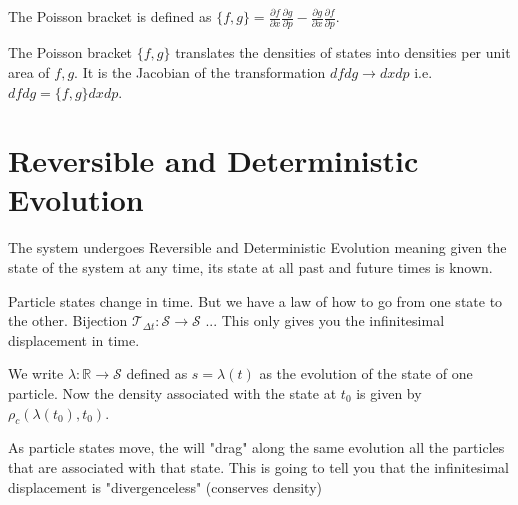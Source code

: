 \documentclass{article}
\begin{document}
\begin{defn}
	The Poisson bracket is defined as $\{f,g\} = \frac{\partial f}{\partial x}\frac{\partial g}{\partial p} - \frac{\partial g}{\partial x}\frac{\partial f}{\partial p}$.
\end{defn}

\begin{prop}
	The Poisson bracket $\{f, g\}$ translates the densities of states into densities per unit area of $f, g$. It is the Jacobian of the transformation $dfdg \rightarrow dxdp$ i.e. $dfdg = \{f,g\}dxdp$.
\end{prop}
	
\section{Reversible and Deterministic Evolution}

\begin{assump}
	The system undergoes Reversible and Deterministic Evolution meaning given the state of the system at any time, its state at all past and future times is known.
\end{assump}

Particle states change in time. But we have a law of how to go from one state to the other. Bijection $\mathcal{T}_{\Delta t} : \mathcal{S} \to \mathcal{S}$ ... This only gives you the infinitesimal displacement in time.

\begin{defn}
	We write $\lambda: \mathbb{R} \rightarrow \mathcal{S}$ defined as $s = \lambda(t)$ as the evolution of the state of one particle. Now the density associated with the state at $t_0$ is given by $\rho_c(\lambda(t_0),t_0)$.
\end{defn}

	
As particle states move, the will "drag" along the same evolution all the particles that are associated with that state. This is going to tell you that the infinitesimal displacement is "divergenceless" (conserves density)
\end{document}
